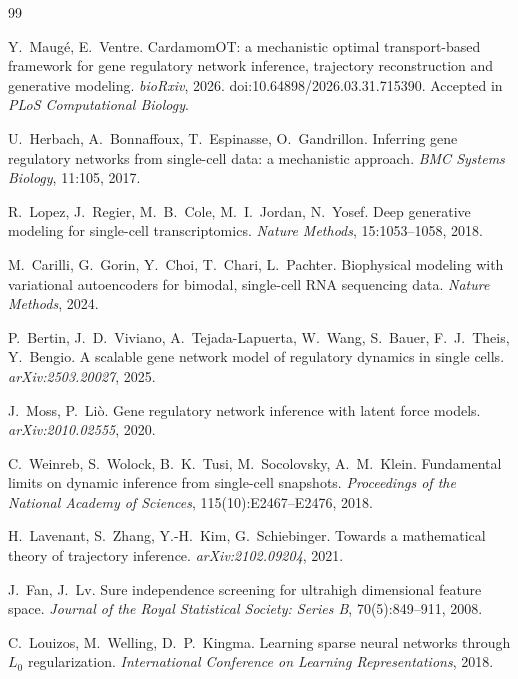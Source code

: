 \documentclass[a4paper, 11pt]{article}
\theoremstyle{plain}
\theoremstyle{remark}
\begin{document}
\begin{thebibliography}{99}

Y.~Maugé, E.~Ventre.
\newblock CardamomOT: a mechanistic optimal transport-based framework for gene regulatory network inference, trajectory reconstruction and generative modeling.
\newblock \emph{bioRxiv}, 2026. doi:10.64898/2026.03.31.715390. Accepted in \emph{PLoS Computational Biology}.

U.~Herbach, A.~Bonnaffoux, T.~Espinasse, O.~Gandrillon.
\newblock Inferring gene regulatory networks from single-cell data: a mechanistic approach.
\newblock \emph{BMC Systems Biology}, 11:105, 2017.

R.~Lopez, J.~Regier, M.~B.~Cole, M.~I.~Jordan, N.~Yosef.
\newblock Deep generative modeling for single-cell transcriptomics.
\newblock \emph{Nature Methods}, 15:1053--1058, 2018.

M.~Carilli, G.~Gorin, Y.~Choi, T.~Chari, L.~Pachter.
\newblock Biophysical modeling with variational autoencoders for bimodal, single-cell RNA sequencing data.
\newblock \emph{Nature Methods}, 2024.

P.~Bertin, J.~D.~Viviano, A.~Tejada-Lapuerta, W.~Wang, S.~Bauer, F.~J.~Theis, Y.~Bengio.
\newblock A scalable gene network model of regulatory dynamics in single cells.
\newblock \emph{arXiv:2503.20027}, 2025.

J.~Moss, P.~Liò.
\newblock Gene regulatory network inference with latent force models.
\newblock \emph{arXiv:2010.02555}, 2020.

C.~Weinreb, S.~Wolock, B.~K.~Tusi, M.~Socolovsky, A.~M.~Klein.
\newblock Fundamental limits on dynamic inference from single-cell snapshots.
\newblock \emph{Proceedings of the National Academy of Sciences}, 115(10):E2467--E2476, 2018.

H.~Lavenant, S.~Zhang, Y.-H.~Kim, G.~Schiebinger.
\newblock Towards a mathematical theory of trajectory inference.
\newblock \emph{arXiv:2102.09204}, 2021.

J.~Fan, J.~Lv.
\newblock Sure independence screening for ultrahigh dimensional feature space.
\newblock \emph{Journal of the Royal Statistical Society: Series B}, 70(5):849--911, 2008.

C.~Louizos, M.~Welling, D.~P.~Kingma.
\newblock Learning sparse neural networks through $L_0$ regularization.
\newblock \emph{International Conference on Learning Representations}, 2018.


\end{thebibliography}
\end{document}

